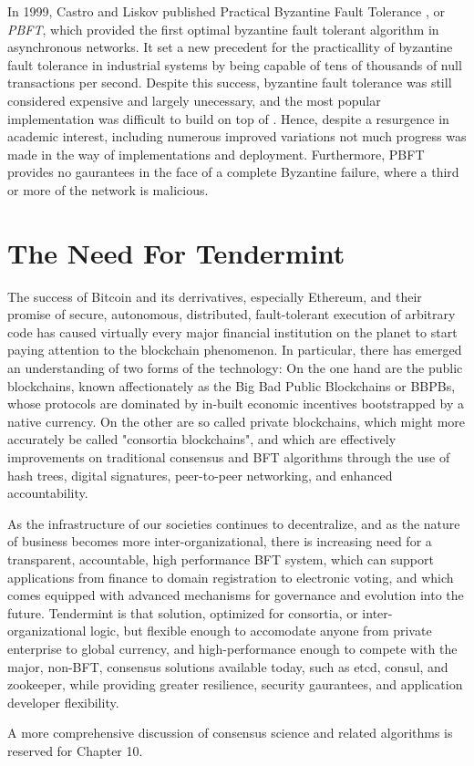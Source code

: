 In 1999, Castro and Liskov published Practical Byzantine Fault Tolerance \cite{pbft}, or \emph{PBFT}, 
which provided the first optimal byzantine fault tolerant algorithm in asynchronous networks.
It set a new precedent for the practicallity of byzantine fault tolerance in industrial systems by being capable of 
tens of thousands of null transactions per second.
Despite this success, byzantine fault tolerance was still considered expensive and largely unecessary, 
and the most popular implementation was difficult to build on top of \cite{ppbft}.
Hence, despite a resurgence in academic interest, including numerous improved variations \cite{yin2003separating, kotla2007zyzzyva}
not much progress was made in the way of implementations and deployment.
Furthermore, PBFT provides no gaurantees in the face of a complete Byzantine failure, where a third or more of the network is malicious.

\section{The Need For Tendermint}

The success of Bitcoin and its derrivatives, especially Ethereum, and their promise of secure, autonomous, distributed, fault-tolerant execution of arbitrary code has caused virtually every major financial institution on the planet to start paying attention to the blockchain phenomenon. 
In particular, there has emerged an understanding of two forms of the technology:
On the one hand are the public blockchains, known affectionately as the Big Bad Public Blockchains or BBPBs, 
whose protocols are dominated by in-built economic incentives bootstrapped by a native currency.
On the other are so called private blockchains, which might more accurately be called "consortia blockchains",
and which are effectively improvements on traditional consensus and BFT algorithms through the use of hash trees, digital signatures, 
peer-to-peer networking, and enhanced accountability.

As the infrastructure of our societies continues to decentralize, and as the nature of business becomes more inter-organizational,
there is increasing need for a transparent, accountable, high performance BFT system, which can support applications from finance to domain registration to electronic voting,
and which comes equipped with advanced mechanisms for governance and evolution into the future.
Tendermint is that solution, optimized for consortia, or inter-organizational logic, but flexible enough to accomodate anyone from private enterprise to global currency,
and high-performance enough to compete with the major, non-BFT, consensus solutions available today, such as etcd, consul, and zookeeper, while providing greater resilience, security gaurantees, and application developer flexibility.

A more comprehensive discussion of consensus science and related algorithms is reserved for Chapter 10.

